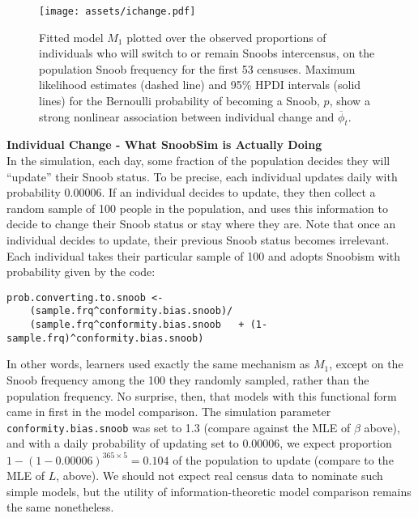 \documentclass[11pt]{article}
\begin{document}
\begin{figure}[t]
\begin{center}
\texttt{[image: assets/ichange.pdf]}
\caption{Fitted model $M_1$ plotted over the observed proportions of individuals who will switch to or remain Snoobs intercensus, on the population Snoob frequency for the first 53 censuses.  Maximum likelihood estimates (dashed line) and 95\% HPDI intervals (solid lines) for the Bernoulli probability of becoming a Snoob, $p$, show a strong nonlinear association between individual change and $\overline{\phi}_t$.}
\label{fig:ichange}
\end{center}
\end{figure}





\newpage
\textbf{Individual Change - What SnoobSim is Actually Doing}\\

In the simulation, each day, some fraction of the population decides they will ``update'' their Snoob status.  To be precise, each individual updates daily with probability 0.00006.  If an individual decides to update, they then collect a random sample of 100 people in the population, and uses this information to decide to change their Snoob status or stay where they are.  Note that once an individual decides to update, their previous Snoob status becomes irrelevant.  Each individual takes their particular sample of 100 and adopts Snoobism with probability given by the code:

\begin{verbatim}
prob.converting.to.snoob <- 
	(sample.frq^conformity.bias.snoob)/
	(sample.frq^conformity.bias.snoob	+ (1-sample.frq)^conformity.bias.snoob)
\end{verbatim}

In other words, learners used exactly the same mechanism as $M_1$, except on the Snoob frequency among the 100 they randomly sampled, rather than the population frequency.  No surprise, then, that models with this functional form came in first in the model comparison.  The simulation parameter \texttt{conformity.bias.snoob} was set to 1.3 (compare against the MLE of $\beta$ above), and with a daily probability of updating set to 0.00006, we expect proportion $1-(1-0.00006)^{365\times5}=0.104$ of the population to update (compare to the MLE of $L$, above).  We should not expect real census data to nominate such simple models, but the utility of information-theoretic model comparison remains the same nonetheless.
\end{document}
